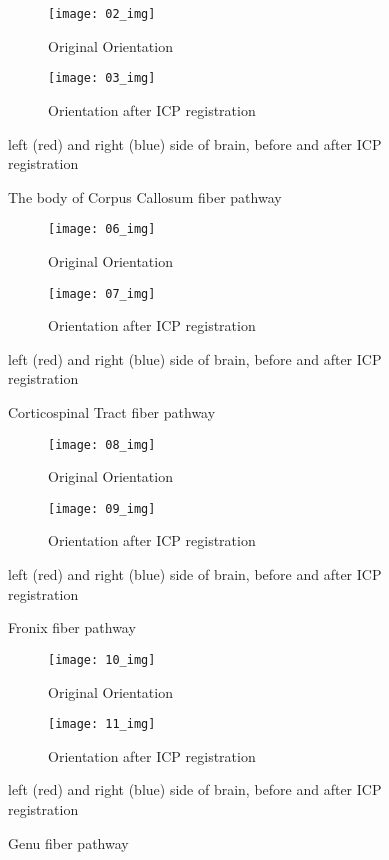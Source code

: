 \documentclass[../structure.tex]{subfiles}
\begin{document}
\begin{figure}[H]
	\centering
	\begin{subfigure}[b]{0.49\textwidth}
	\centering
	\texttt{[image: 02\_img]}
	\caption{Original Orientation}
	\end{subfigure}
	\begin{subfigure}[b]{0.49\textwidth}
	\centering
	\texttt{[image: 03\_img]}
	\caption{Orientation after ICP registration}
	\end{subfigure}
\captionsetup{justification=centering}
\caption{The body of Corpus Callosum fiber pathway}{ left (red) and right (blue) side of brain, before and after ICP registration}
\label{fig:pca}
\end{figure}

\begin{figure}[H]
	\centering
	\begin{subfigure}[b]{0.49\textwidth}
	\centering
	\texttt{[image: 06\_img]}
	\caption{Original Orientation}
	\end{subfigure}
	\begin{subfigure}[b]{0.49\textwidth}
	\centering
	\texttt{[image: 07\_img]}
	\caption{Orientation after ICP registration}
	\end{subfigure}
\captionsetup{justification=centering}
\caption{Corticospinal Tract fiber pathway}{ left (red) and right (blue) side of brain, before and after ICP registration}
\label{fig:pca}
\end{figure}

\begin{figure}[H]
	\centering
	\begin{subfigure}[b]{0.49\textwidth}
	\centering
	\texttt{[image: 08\_img]}
	\caption{Original Orientation}
	\end{subfigure}
	\begin{subfigure}[b]{0.49\textwidth}
	\centering
	\texttt{[image: 09\_img]}
	\caption{Orientation after ICP registration}
	\end{subfigure}
\captionsetup{justification=centering}
\caption{Fronix fiber pathway}{ left (red) and right (blue) side of brain, before and after ICP registration}
\label{fig:pca}
\end{figure}

\begin{figure}[H]
	\centering
	\begin{subfigure}[b]{0.49\textwidth}
	\centering
	\texttt{[image: 10\_img]}
	\caption{Original Orientation}
	\end{subfigure}
	\begin{subfigure}[b]{0.49\textwidth}
	\centering
	\texttt{[image: 11\_img]}
	\caption{Orientation after ICP registration}
	\end{subfigure}
\captionsetup{justification=centering}
\caption{Genu fiber pathway}{ left (red) and right (blue) side of brain, before and after ICP registration}
\label{fig:pca}
\end{figure}
\end{document}
